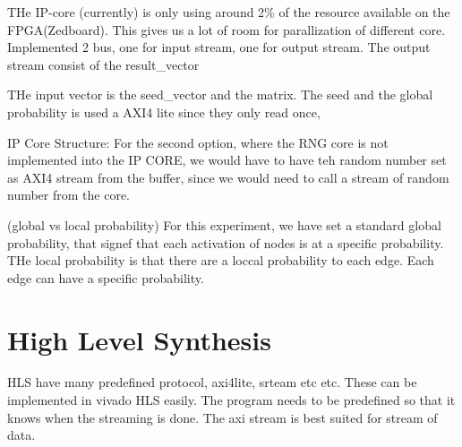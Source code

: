 THe IP-core (currently) is only using around 2\% of the resource available on the FPGA(Zedboard). This gives us a lot of room for parallization of different core. Implemented 2 bus, one for input stream, one for output stream. The output stream consist of the result_vector

THe input vector is the seed_vector and the matrix. The seed and the global probability is used a AXI4 lite since they only read once, 


IP Core Structure:
For the second option, where the RNG core is not implemented into the IP CORE, we would have to have teh random number set as AXI4 stream from the buffer, since we would need to call a stream of random number from the core.


(global vs local probability)
For this experiment, we have set a standard global probability, that signef that each activation of nodes is at a specific probability. THe local probability is that there are a loccal probability to each edge. Each edge can have a specific probability.


\section{High Level Synthesis}
HLS have many predefined protocol, axi4lite, srteam etc etc. These can be implemented in vivado HLS easily. The program needs to be predefined so that it knows when the streaming is done. The axi stream is best suited for stream of data.